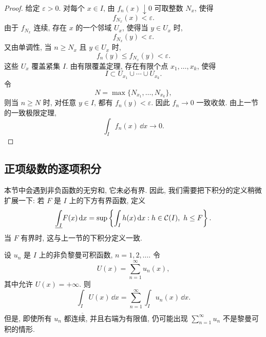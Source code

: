 \begin{proof}
	给定 \(\varepsilon>0\). 对每个 \(x\in I\), 由 \(f_n(x)\downarrow 0\) 可取整数
	\(N_x\), 使得
	\[
	f_{N_x}(x)<\varepsilon.
	\]
	由于 \(f_{N_x}\) 连续, 存在 \(x\) 的一个邻域 \(U_x\), 使得当 \(y\in U_x\) 时,
	\[
	f_{N_x}(y)<\varepsilon.
	\]
	又由单调性, 当 \(n\geq N_x\) 且 \(y\in U_x\) 时,
	\[
	f_n(y)\leq f_{N_x}(y)<\varepsilon.
	\]
	这些 \(U_x\) 覆盖紧集 \(I\). 由有限覆盖定理, 存在有限个点
	\(x_1,\ldots,x_k\), 使得
	\[
	I\subset U_{x_1}\cup\cdots\cup U_{x_k}.
	\]
	令
	\[
	N=\max\{N_{x_1},\ldots,N_{x_k}\},
	\]
	则当 \(n\geq N\) 时, 对任意 \(y\in I\), 都有 \(f_n(y)<\varepsilon\). 因此
	\(f_n\to 0\) 一致收敛. 由上一节的一致极限定理,
	\[
	\int_I f_n(x)\,\dd x\longrightarrow 0.
	\]
\end{proof}

\subsection{正项级数的逐项积分}

本节中会遇到非负函数的无穷和, 它未必有界. 因此, 我们需要把下积分的定义稍微扩展一下: 若 \(F\) 是 \(I\) 上的下方有界函数, 定义
\[
\underline{\int_I}F(x)\,\dd x
=
\sup\left\{
\int_I h(x)\,\dd x:
h\in \mathcal{C}(I),\ h\leq F
\right\}.
\]
当 \(F\) 有界时, 这与上一节的下积分定义一致.

\begin{thm}[非负项级数的下积分]
	\label{thm:positive-series-riemann}
	设 \(u_n\) 是 \(I\) 上的非负黎曼可积函数, \(n=1,2,\ldots\). 令
	\[
	U(x)=\sum_{n=1}^{\infty}u_n(x),
	\]
	其中允许 \(U(x)=+\infty\). 则
	\[
	\underline{\int_I}U(x)\,\dd x
	=
	\sum_{n=1}^{\infty}\int_I u_n(x)\,\dd x.
	\]
	但是, 即使所有 \(u_n\) 都连续, 并且右端为有限值, 仍可能出现
	\(\sum_{n=1}^{\infty}u_n\) 不是黎曼可积的情形.
\end{thm}

